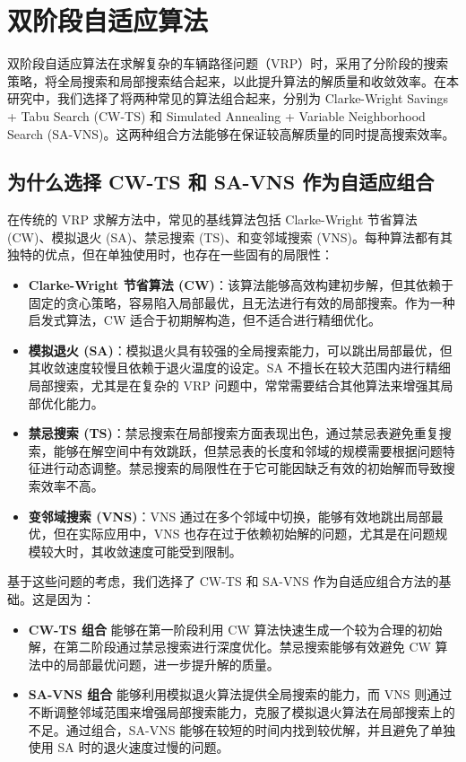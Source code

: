 \documentclass[12pt,a4paper,twoside]{ctexbook}
\begin{document}
\section{双阶段自适应算法}
双阶段自适应算法在求解复杂的车辆路径问题（VRP）时，采用了分阶段的搜索策略，将全局搜索和局部搜索结合起来，以此提升算法的解质量和收敛效率。在本研究中，我们选择了将两种常见的算法组合起来，分别为 Clarke-Wright Savings + Tabu Search (CW-TS) 和 Simulated Annealing + Variable Neighborhood Search (SA-VNS)。这两种组合方法能够在保证较高解质量的同时提高搜索效率。

\subsection{为什么选择 CW-TS 和 SA-VNS 作为自适应组合}
在传统的 VRP 求解方法中，常见的基线算法包括 Clarke-Wright 节省算法 (CW)、模拟退火 (SA)、禁忌搜索 (TS)、和变邻域搜索 (VNS)。每种算法都有其独特的优点，但在单独使用时，也存在一些固有的局限性：
\begin{itemize}
    \item \textbf{Clarke-Wright 节省算法 (CW)}：该算法能够高效构建初步解，但其依赖于固定的贪心策略，容易陷入局部最优，且无法进行有效的局部搜索。作为一种启发式算法，CW 适合于初期解构造，但不适合进行精细优化。
    \item \textbf{模拟退火 (SA)}：模拟退火具有较强的全局搜索能力，可以跳出局部最优，但其收敛速度较慢且依赖于退火温度的设定。SA 不擅长在较大范围内进行精细局部搜索，尤其是在复杂的 VRP 问题中，常常需要结合其他算法来增强其局部优化能力。
    \item \textbf{禁忌搜索 (TS)}：禁忌搜索在局部搜索方面表现出色，通过禁忌表避免重复搜索，能够在解空间中有效跳跃，但禁忌表的长度和邻域的规模需要根据问题特征进行动态调整。禁忌搜索的局限性在于它可能因缺乏有效的初始解而导致搜索效率不高。
    \item \textbf{变邻域搜索 (VNS)}：VNS 通过在多个邻域中切换，能够有效地跳出局部最优，但在实际应用中，VNS 也存在过于依赖初始解的问题，尤其是在问题规模较大时，其收敛速度可能受到限制。
\end{itemize}

基于这些问题的考虑，我们选择了 CW-TS 和 SA-VNS 作为自适应组合方法的基础。这是因为：
\begin{itemize}
    \item \textbf{CW-TS 组合} 能够在第一阶段利用 CW 算法快速生成一个较为合理的初始解，在第二阶段通过禁忌搜索进行深度优化。禁忌搜索能够有效避免 CW 算法中的局部最优问题，进一步提升解的质量。
    \item \textbf{SA-VNS 组合} 能够利用模拟退火算法提供全局搜索的能力，而 VNS 则通过不断调整邻域范围来增强局部搜索能力，克服了模拟退火算法在局部搜索上的不足。通过组合，SA-VNS 能够在较短的时间内找到较优解，并且避免了单独使用 SA 时的退火速度过慢的问题。
\end{itemize}
\end{document}
